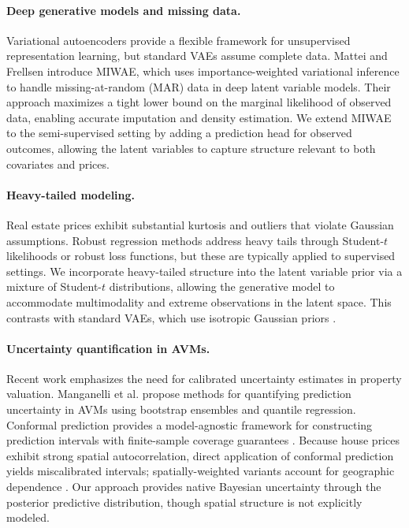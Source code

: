 \documentclass{article}
\begin{document}
\paragraph{Deep generative models and missing data.} Variational autoencoders provide a flexible framework for unsupervised representation learning, but standard VAEs assume complete data. Mattei and Frellsen \cite{mattei2019miwae} introduce MIWAE, which uses importance-\allowbreak weighted variational inference to handle missing-at-random (MAR) data in deep latent variable models. Their approach maximizes a tight lower bound on the marginal likelihood of observed data, enabling accurate imputation and density estimation. We extend MIWAE to the semi-supervised setting by adding a prediction head for observed outcomes, allowing the latent variables to capture structure relevant to both covariates and prices.

\paragraph{Heavy-tailed modeling.} Real estate prices exhibit substantial kurtosis and outliers that violate Gaussian assumptions. Robust regression methods address heavy tails through Student-$t$ likelihoods or robust loss functions, but these are typically applied to supervised settings. We incorporate heavy-tailed structure into the latent variable prior via a mixture of Student-$t$ distributions, allowing the generative model to accommodate multimodality and extreme observations in the latent space. This contrasts with standard VAEs, which use isotropic Gaussian priors \cite{kingma14vae}.

\paragraph{Uncertainty quantification in AVMs.} Recent work emphasizes the need for calibrated uncertainty estimates in property valuation. Manganelli et al. \cite{manganelli_uq_2024} propose methods for quantifying prediction uncertainty in AVMs using bootstrap ensembles and quantile regression. Conformal prediction provides a model-agnostic framework for constructing prediction intervals with finite-sample coverage guarantees \cite{conformal2023spatially}. Because house prices exhibit strong spatial autocorrelation, direct application of conformal prediction yields miscalibrated intervals; spatially-weighted variants account for geographic dependence \cite{conformal2023spatially}. Our approach provides native Bayesian uncertainty through the posterior predictive distribution, though spatial structure is not explicitly modeled.
\end{document}
